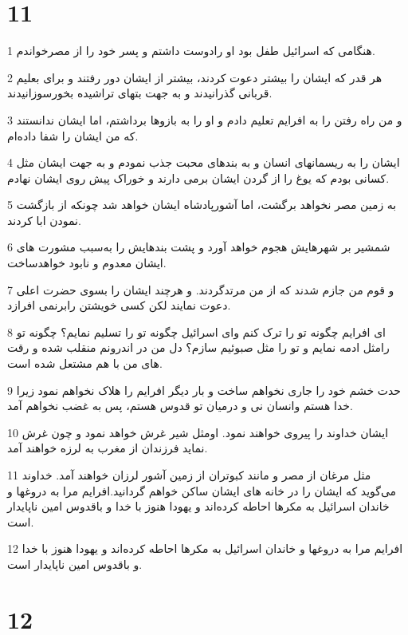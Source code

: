\chapter{11}

\par 1 هنگامی که اسرائیل طفل بود او رادوست داشتم و پسر خود را از مصرخواندم.
\par 2 هر قدر که ایشان را بیشتر دعوت کردند، بیشتر از ایشان دور رفتند و برای بعلیم قربانی گذرانیدند و به جهت بتهای تراشیده بخورسوزانیدند.
\par 3 و من راه رفتن را به افرایم تعلیم دادم و او را به بازوها برداشتم، اما ایشان ندانستند که من ایشان را شفا داده‌ام.
\par 4 ایشان را به ریسمانهای انسان و به بندهای محبت جذب نمودم و به جهت ایشان مثل کسانی بودم که یوغ را از گردن ایشان برمی دارند و خوراک پیش روی ایشان نهادم.
\par 5 به زمین مصر نخواهد برگشت، اما آشورپادشاه ایشان خواهد شد چونکه از بازگشت نمودن ابا کردند.
\par 6 شمشیر بر شهرهایش هجوم خواهد آورد و پشت بندهایش را به‌سبب مشورت های ایشان معدوم و نابود خواهدساخت.
\par 7 و قوم من جازم شدند که از من مرتدگردند. و هر‌چند ایشان را بسوی حضرت اعلی دعوت نمایند لکن کسی خویشتن رابرنمی افرازد.
\par 8 ‌ای افرایم چگونه تو را ترک کنم و‌ای اسرائیل چگونه تو را تسلیم نمایم؟ چگونه تو رامثل ادمه نمایم و تو را مثل صبوئیم سازم؟ دل من در اندرونم منقلب شده و رقت های من با هم مشتعل شده است.
\par 9 حدت خشم خود را جاری نخواهم ساخت و بار دیگر افرایم را هلاک نخواهم نمود زیرا خدا هستم وانسان نی و درمیان تو قدوس هستم، پس به غضب نخواهم آمد.
\par 10 ایشان خداوند را پیروی خواهند نمود. اومثل شیر غرش خواهد نمود و چون غرش نماید فرزندان از مغرب به لرزه خواهند آمد.
\par 11 مثل مرغان از مصر و مانند کبوتران از زمین آشور لرزان خواهند آمد. خداوند می‌گوید که ایشان را در خانه های ایشان ساکن خواهم گردانید.افرایم مرا به دروغها و خاندان اسرائیل به مکرها احاطه کرده‌اند و یهودا هنوز با خدا و باقدوس امین ناپایدار است.
\par 12 افرایم مرا به دروغها و خاندان اسرائیل به مکرها احاطه کرده‌اند و یهودا هنوز با خدا و باقدوس امین ناپایدار است.

\chapter{12}

